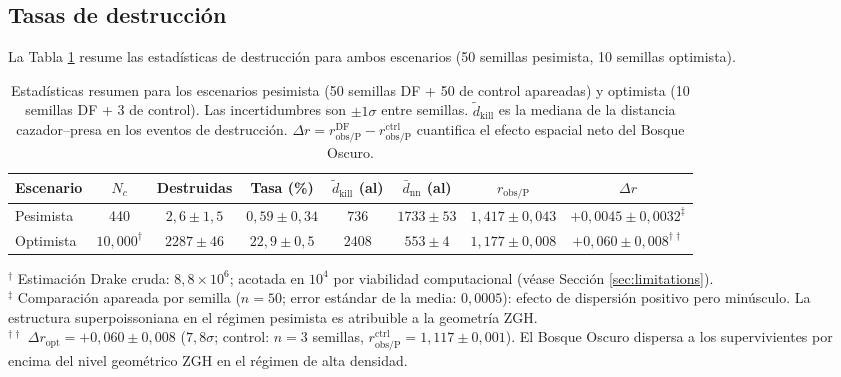 \documentclass[useAMS,usenatbib,onecolumn]{mn2e}
\begin{document}
\subsection{Tasas de destrucción}
\label{sec:destruction}

La Tabla \ref{tab:results} resume las estadísticas de destrucción para
ambos escenarios (50 semillas pesimista, 10 semillas optimista).

\begin{table}
  \centering
  \caption{Estadísticas resumen para los escenarios pesimista
           (50 semillas DF + 50 de control apareadas) y optimista
           (10 semillas DF + 3 de control).
           Las incertidumbres son $\pm 1\sigma$ entre semillas.
           $\tilde{d}_\text{kill}$ es la mediana de la distancia
           cazador--presa en los eventos de destrucción.
           $\Delta r = r_\text{obs/P}^\text{DF} - r_\text{obs/P}^\text{ctrl}$
           cuantifica el efecto espacial neto del Bosque Oscuro.}
  \label{tab:results}
  \begin{tabular}{lccccccc}
    \toprule
    Escenario & $N_c$ & Destruidas & Tasa (\%) &
    $\tilde{d}_\text{kill}$ (al) &
    $\bar{d}_\text{nn}$ (al) & $r_\text{obs/P}$ & $\Delta r$ \\
    \midrule
    Pesimista & 440 & $2{,}6 \pm 1{,}5$ & $0{,}59 \pm 0{,}34$ &
    $736$ & $1733 \pm 53$ & $1{,}417 \pm 0{,}043$ &
    $+0{,}0045 \pm 0{,}0032^\ddagger$ \\
    Optimista  & $10{,}000^\dagger$ & $2287 \pm 46$ & $22{,}9 \pm 0{,}5$ &
    $2408$ & $553 \pm 4$  & $1{,}177 \pm 0{,}008$ &
    $+0{,}060 \pm 0{,}008^{\dagger\dagger}$ \\
    \bottomrule
  \end{tabular}
  \begin{flushleft}
    \footnotesize
    $^\dagger$ Estimación Drake cruda: $8{,}8\times10^6$; acotada en $10^4$
    por viabilidad computacional (véase Sección \ref{sec:limitations}).\\
    $^\ddagger$ Comparación apareada por semilla ($n = 50$;
    error estándar de la media: $0{,}0005$): efecto de dispersión
    positivo pero minúsculo. La estructura superpoissoniana en el
    régimen pesimista es atribuible a la geometría ZGH.\\
    $^{\dagger\dagger}$ $\Delta r_\text{opt} = +0{,}060 \pm 0{,}008$
    ($7{,}8\sigma$; control: $n = 3$ semillas,
    $r_\text{obs/P}^\text{ctrl} = 1{,}117 \pm 0{,}001$).
    El Bosque Oscuro dispersa a los supervivientes por encima del nivel
    geométrico ZGH en el régimen de alta densidad.
  \end{flushleft}
\end{table}
\end{document}
